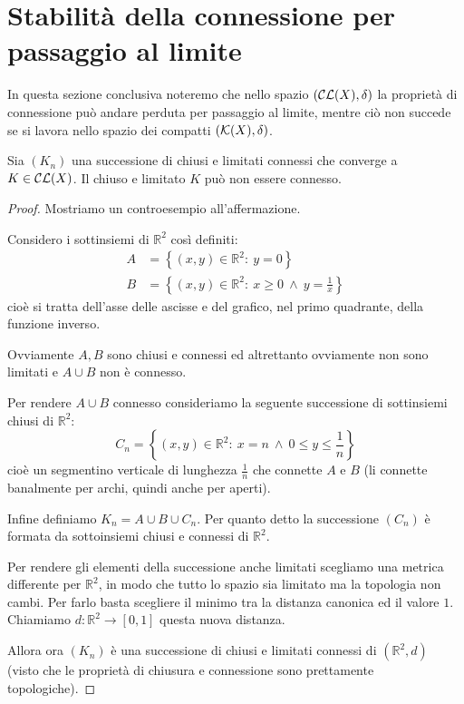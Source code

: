 \section{Stabilità della connessione per passaggio al limite}
In questa sezione conclusiva noteremo che nello spazio $(\mathcal{CL}(X),\delta)$ la proprietà di connessione può andare perduta per passaggio al limite, mentre ciò non succede se si lavora nello spazio dei compatti $(\mathcal{K}(X),\delta)$.

\begin{theorem}
	Sia $(K_n)$ una successione di chiusi e limitati connessi che converge a $K\in\mathcal{CL}(X)$. Il chiuso e limitato $K$ può non essere connesso.
\end{theorem}
\begin{proof}
	Mostriamo un controesempio all'affermazione.
	
	Considero i sottinsiemi di $\mathbb R^2$ così definiti:
	\begin{align*}
		A&=\left\{(x,y)\in\mathbb R^2:\ y=0\right\}\\
		B&=\left\{(x,y)\in\mathbb R^2:\ x\ge 0\ \wedge\ y=\frac 1x \right\}
	\end{align*}
	cioè si tratta dell'asse delle ascisse e del grafico, nel primo quadrante, della funzione inverso.
	
	Ovviamente $A,B$ sono chiusi e connessi ed altrettanto ovviamente non sono limitati e $A\cup B$ non è connesso.
	
	Per rendere $A\cup B$ connesso consideriamo la seguente successione di sottinsiemi chiusi di $\mathbb R^2$:
	\begin{equation}
		C_n=\left\{(x,y)\in\mathbb R^2:\ x=n\ \wedge\ 0\le y\le \frac 1n\right\}
	\end{equation}
	cioè un segmentino verticale di lunghezza $\frac 1n$ che connette $A$ e $B$ (li connette banalmente per archi, quindi anche per aperti).
	
	Infine definiamo $K_n=A\cup B\cup C_n$. Per quanto detto la successione $(C_n)$ è formata da sottoinsiemi chiusi e connessi di $\mathbb R^2$.
	
	Per rendere gli elementi della successione anche limitati scegliamo una metrica differente per $\mathbb R^2$, in modo che tutto lo spazio sia limitato ma la topologia non cambi. Per farlo basta scegliere il minimo tra la distanza canonica ed il valore $1$. Chiamiamo $d:\mathbb R^2\to [0,1]$ questa nuova distanza.
	
	Allora ora $(K_n)$ è una successione di chiusi e limitati connessi di $(\mathbb R^2, d)$ (visto che le proprietà di chiusura e connessione sono prettamente topologiche).
	

\end{proof}
